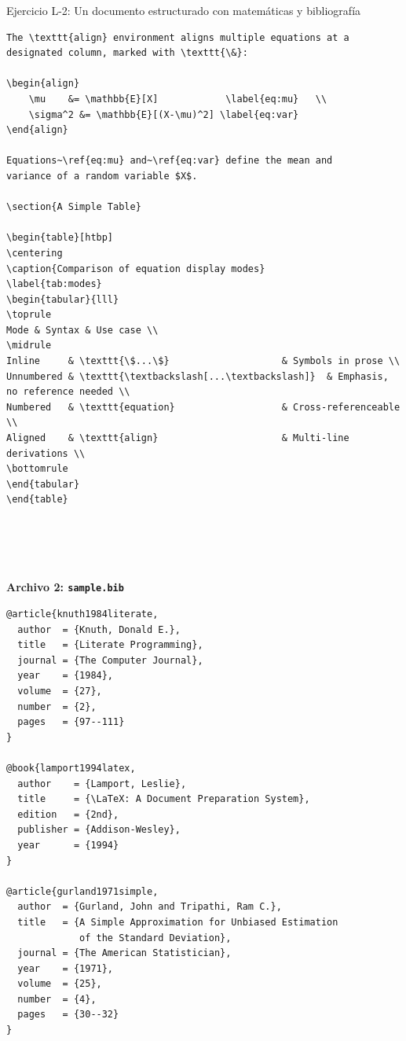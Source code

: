 \begin{infobox}{Ejercicio L-2: Un documento estructurado con matemáticas y bibliografía}
\begin{lstlisting}[style=inlineStyle]
The \texttt{align} environment aligns multiple equations at a
designated column, marked with \texttt{\&}:

\begin{align}
    \mu    &= \mathbb{E}[X]            \label{eq:mu}   \\
    \sigma^2 &= \mathbb{E}[(X-\mu)^2] \label{eq:var}
\end{align}

Equations~\ref{eq:mu} and~\ref{eq:var} define the mean and
variance of a random variable $X$.

\section{A Simple Table}

\begin{table}[htbp]
\centering
\caption{Comparison of equation display modes}
\label{tab:modes}
\begin{tabular}{lll}
\toprule
Mode & Syntax & Use case \\
\midrule
Inline     & \texttt{\$...\$}                    & Symbols in prose \\
Unnumbered & \texttt{\textbackslash[...\textbackslash]}  & Emphasis, no reference needed \\
Numbered   & \texttt{equation}                   & Cross-referenceable \\
Aligned    & \texttt{align}                      & Multi-line derivations \\
\bottomrule
\end{tabular}
\end{table}





\end{lstlisting}

\vs
\noindent
\textbf{Archivo 2: \texttt{sample.bib}}

\begin{lstlisting}[style=inlineStyle]
@article{knuth1984literate,
  author  = {Knuth, Donald E.},
  title   = {Literate Programming},
  journal = {The Computer Journal},
  year    = {1984},
  volume  = {27},
  number  = {2},
  pages   = {97--111}
}

@book{lamport1994latex,
  author    = {Lamport, Leslie},
  title     = {\LaTeX: A Document Preparation System},
  edition   = {2nd},
  publisher = {Addison-Wesley},
  year      = {1994}
}

@article{gurland1971simple,
  author  = {Gurland, John and Tripathi, Ram C.},
  title   = {A Simple Approximation for Unbiased Estimation
             of the Standard Deviation},
  journal = {The American Statistician},
  year    = {1971},
  volume  = {25},
  number  = {4},
  pages   = {30--32}
}
\end{lstlisting}
\end{infobox}

